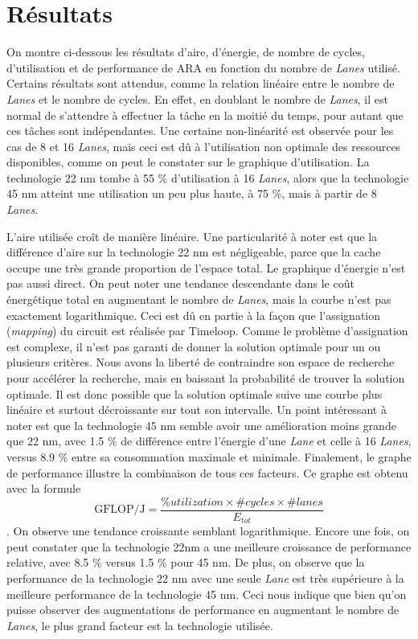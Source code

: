 \documentclass[11pt,letterpaper]{article}
\begin{document}
\section*{Résultats}
    \begin{multicols}{2}

    On montre ci-dessous les résultats d'aire, d'énergie, de nombre de cycles, d'utilisation et de performance 
    de ARA en fonction du nombre de \textit{Lanes} utilisé. Certains résultats sont attendus, comme la relation 
    linéaire entre le nombre de \textit{Lanes} et le nombre de cycles. En effet, en doublant le nombre de \textit{Lanes}, 
    il est normal de s'attendre à effectuer la tâche en la moitié du temps, pour autant que ces tâches sont indépendantes.
    Une certaine non-linéarité est observée pour les cas de 8 et 16 \textit{Lanes}, mais ceci est dû à l'utilisation 
    non optimale des ressources disponibles, comme on peut le constater sur le graphique d'utilisation. La technologie 
    22 nm tombe à 55 \% d'utilisation à 16 \textit{Lanes}, alors que la technologie 45 nm atteint une utilisation un peu plus 
    haute, à 75 \%, mais à partir de 8 \textit{Lanes}.

    L'aire utilisée croît de manière linéaire. Une particularité à noter est que la différence d'aire sur la technologie 
    22 nm est négligeable, parce que la cache occupe une très grande proportion de l'espace total. 
    Le graphique d'énergie n'est pas aussi direct. On peut noter une tendance descendante dans le coût énergétique total 
    en augmentant le nombre de \textit{Lanes}, mais la courbe n'est pas exactement logarithmique. Ceci est dû en partie à 
    la façon que l'assignation (\textit{mapping}) du circuit est réalisée par Timeloop. Comme le problème d'assignation
    est complexe, il n'est pas garanti de donner la solution optimale pour un ou plusieurs critères. Nous avons la liberté
    de contraindre son espace de recherche pour accélérer la recherche, mais en baissant la probabilité de trouver la 
    solution optimale. Il est donc possible que la solution optimale suive une courbe plus linéaire et surtout décroissante
    sur tout son intervalle. Un point intéressant à noter est que la technologie 45 nm semble avoir une amélioration moins 
    grande que 22 nm, avec 1.5 \% de différence entre l'énergie d'une \textit{Lane} et celle à 16 \textit{Lanes}, versus 
    8.9 \% entre sa consommation maximale et minimale. Finalement, le graphe de performance illustre la combinaison de tous 
    ces facteurs. Ce graphe est obtenu avec la formule $$\text{GFLOP/J} = \frac{\%utilization \times \#cycles \times \#lanes}{E_{tot}}$$.
    On observe une tendance croissante semblant logarithmique. Encore une fois, on peut constater que la technologie 22nm 
    a une meilleure croissance de performance relative, avec 8.5 \% versus 1.5 \% pour 45 nm. De plus, on observe que la 
    performance de la technologie 22 nm avec une seule \textit{Lane} est très supérieure à la meilleure performance de la 
    technologie 45 nm. Ceci nous indique que bien qu'on puisse observer des augmentations de performance en augmentant le nombre
    de \textit{Lanes}, le plus grand facteur est la technologie utilisée.
        

\end{multicols}
\end{document}
